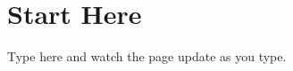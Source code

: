 \documentclass{article}
\begin{document}
\section{Start Here}

Type here and watch the page update as you type.
\end{document}
